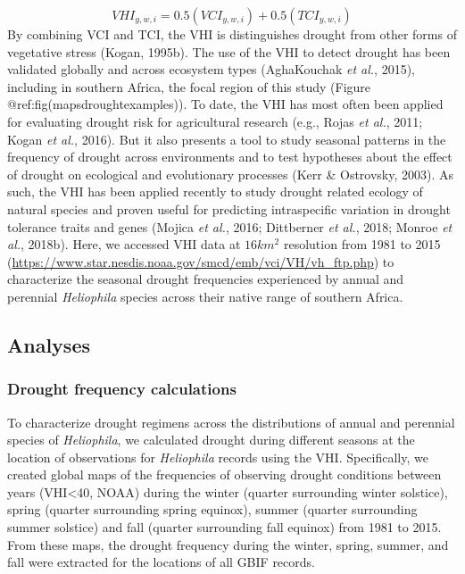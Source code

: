 \documentclass[man,floatsintext]{apa6}
\theoremstyle{definition}
\theoremstyle{definition}
\theoremstyle{definition}
\theoremstyle{remark}
\begin{document}
\[VHI_{y,w,i} = 0.5(VCI_{y,w,i}) + 0.5(TCI_{y,w,i})\] By combining VCI
and TCI, the VHI is distinguishes drought from other forms of vegetative
stress (Kogan, 1995b). The use of the VHI to detect drought has been
validated globally and across ecosystem types (AghaKouchak \emph{et
al.}, 2015), including in southern Africa, the focal region of this
study (Figure @ref:fig(mapsdroughtexamples)). To date, the VHI has most
often been applied for evaluating drought risk for agricultural research
(e.g., Rojas \emph{et al.}, 2011; Kogan \emph{et al.}, 2016). But it
also presents a tool to study seasonal patterns in the frequency of
drought across environments and to test hypotheses about the effect of
drought on ecological and evolutionary processes (Kerr \& Ostrovsky,
2003). As such, the VHI has been applied recently to study drought
related ecology of natural species and proven useful for predicting
intraspecific variation in drought tolerance traits and genes (Mojica
\emph{et al.}, 2016; Dittberner \emph{et al.}, 2018; Monroe \emph{et
al.}, 2018b). Here, we accessed VHI data at \(16km^2\) resolution from
1981 to 2015
(\url{https://www.star.nesdis.noaa.gov/smcd/emb/vci/VH/vh_ftp.php}) to
characterize the seasonal drought frequencies experienced by annual and
perennial \emph{Heliophila} species across their native range of
southern Africa.

\hypertarget{analyses}{%
\subsection{Analyses}\label{analyses}}

\hypertarget{drought-frequency-calculations}{%
\subsubsection{Drought frequency
calculations}\label{drought-frequency-calculations}}

To characterize drought regimens across the distributions of annual and
perennial species of \emph{Heliophila}, we calculated drought during
different seasons at the location of observations for \emph{Heliophila}
records using the VHI. Specifically, we created global maps of the
frequencies of observing drought conditions between years
(VHI\textless{}40, NOAA) during the winter (quarter surrounding winter
solstice), spring (quarter surrounding spring equinox), summer (quarter
surrounding summer solstice) and fall (quarter surrounding fall equinox)
from 1981 to 2015. From these maps, the drought frequency during the
winter, spring, summer, and fall were extracted for the locations of all
GBIF records.
\end{document}
